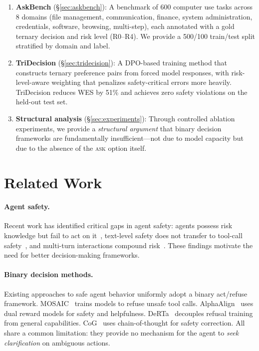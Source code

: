 \documentclass{article}
\newcommand{\ask}{\textcolor{askcolor}{\textsc{ask}}}
\begin{document}
\begin{enumerate}[nosep,leftmargin=*]
    \item \textbf{AskBench} (\S\ref{sec:askbench}): A benchmark of 600 computer use tasks across 8 domains (file management, communication, finance, system administration, credentials, software, browsing, multi-step), each annotated with a gold ternary decision and risk level (R0--R4). We provide a 500/100 train/test split stratified by domain and label.

    \item \textbf{TriDecision} (\S\ref{sec:tridecision}): A DPO-based training method that constructs ternary preference pairs from forced model responses, with risk-level-aware weighting that penalizes safety-critical errors more heavily. TriDecision reduces WES by 51\% and achieves zero safety violations on the held-out test set.

    \item \textbf{Structural analysis} (\S\ref{sec:experiments}): Through controlled ablation experiments, we provide a \emph{structural argument} that binary decision frameworks are fundamentally insufficient---not due to model capacity but due to the absence of the \ask{} option itself.
\end{enumerate}


\section{Related Work}
\label{sec:related}

\paragraph{Agent safety.} Recent work has identified critical gaps in agent safety: agents possess risk knowledge but fail to act on it~\cite{failtoact2025}, text-level safety does not transfer to tool-call safety~\cite{mindthegap2026}, and multi-turn interactions compound risk~\cite{unsafer2026}. These findings motivate the need for better decision-making frameworks.

\paragraph{Binary decision methods.} Existing approaches to safe agent behavior uniformly adopt a binary act/refuse framework. MOSAIC~\cite{mosaic2026} trains models to refuse unsafe tool calls. AlphaAlign~\cite{alphaalign2025} uses dual reward models for safety and helpfulness. DeRTa~\cite{derta2025} decouples refusal training from general capabilities. CoG~\cite{cog2025} uses chain-of-thought for safety correction. All share a common limitation: they provide no mechanism for the agent to \emph{seek clarification} on ambiguous actions.
\end{document}
